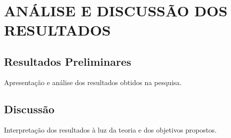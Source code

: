 \chapter{ANÁLISE E DISCUSSÃO DOS RESULTADOS}
\section{Resultados Preliminares}
Apresentação e análise dos resultados obtidos na pesquisa.

\section{Discussão}
Interpretação dos resultados à luz da teoria e dos objetivos propostos.
